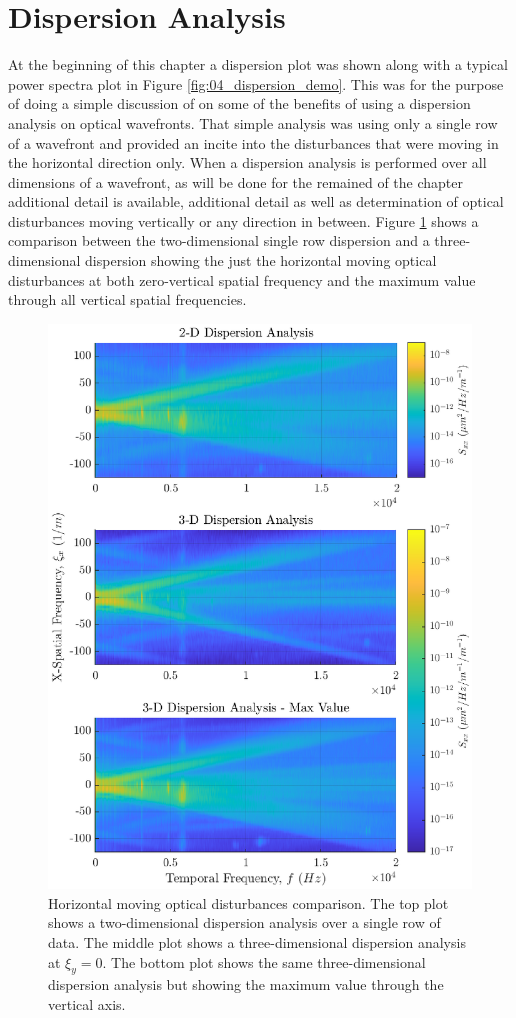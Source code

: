 \section{Dispersion Analysis}
At the beginning of this chapter a dispersion plot was shown along with a typical power spectra plot in Figure \ref{fig:04_dispersion_demo}.
This was for the purpose of doing a simple discussion of on some of the benefits of using a dispersion analysis on optical wavefronts.
That simple analysis was using only a single row of a wavefront and provided an incite into the disturbances that were moving in the horizontal direction only.
When a dispersion analysis is performed over all dimensions of a wavefront, as will be done for the remained of the chapter additional detail is available, additional detail as well as determination of optical disturbances moving vertically or any direction in between.
Figure \ref{fig:04_dispersion_comparison} shows a comparison between the two-dimensional single row dispersion and a three-dimensional dispersion showing the just the horizontal moving optical disturbances at both zero-vertical spatial frequency and the maximum value through all vertical spatial frequencies.
\begin{figure}
  \centering
  \includegraphics{../matlab/04_dispersion_analysis/dispersion_comparison.eps}
  \caption{Horizontal moving optical disturbances comparison. The top plot shows a two-dimensional dispersion analysis over a single row of data. The middle plot shows a three-dimensional dispersion analysis at $\xi_y=0$. The bottom plot shows the same three-dimensional dispersion analysis but showing the maximum value through the vertical axis.}
  \label{fig:04_dispersion_comparison}
\end{figure}
